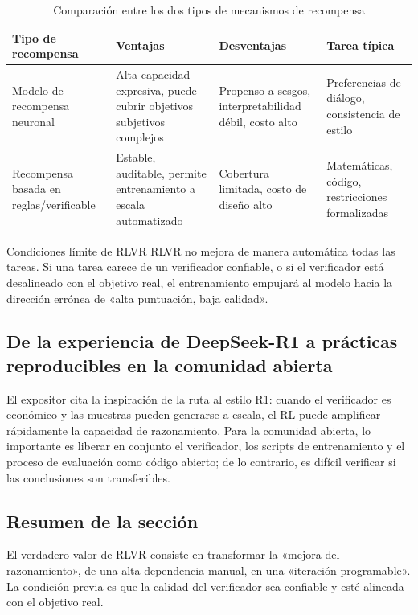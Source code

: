 \documentclass[a4paper]{article}
\begin{document}
\begin{table}[H]
\centering
\renewcommand{\arraystretch}{1.2}
\begin{tabular}{p{2.8cm}p{3.6cm}p{3.8cm}p{2.8cm}}
\toprule
\textbf{Tipo de recompensa} & \textbf{Ventajas} & \textbf{Desventajas} & \textbf{Tarea típica} \\
\midrule
Modelo de recompensa neuronal & Alta capacidad expresiva, puede cubrir objetivos subjetivos complejos & Propenso a sesgos, interpretabilidad débil, costo alto & Preferencias de diálogo, consistencia de estilo \\
Recompensa basada en reglas/verificable & Estable, auditable, permite entrenamiento a escala automatizado & Cobertura limitada, costo de diseño alto & Matemáticas, código, restricciones formalizadas \\
\bottomrule
\end{tabular}
\caption{Comparación entre los dos tipos de mecanismos de recompensa}
\end{table}

\begin{warningbox}{Condiciones límite de RLVR}
RLVR no mejora de manera automática todas las tareas. Si una tarea carece de un verificador confiable, o si el verificador está desalineado con el objetivo real, el entrenamiento empujará al modelo hacia la dirección errónea de «alta puntuación, baja calidad».
\end{warningbox}

\subsection{De la experiencia de DeepSeek-R1 a prácticas reproducibles en la comunidad abierta}
El expositor cita la inspiración de la ruta al estilo R1: cuando el verificador es económico y las muestras pueden generarse a escala, el RL puede amplificar rápidamente la capacidad de razonamiento. Para la comunidad abierta, lo importante es liberar en conjunto el verificador, los scripts de entrenamiento y el proceso de evaluación como código abierto; de lo contrario, es difícil verificar si las conclusiones son transferibles.

\subsection{Resumen de la sección}
El verdadero valor de RLVR consiste en transformar la «mejora del razonamiento», de una alta dependencia manual, en una «iteración programable». La condición previa es que la calidad del verificador sea confiable y esté alineada con el objetivo real.
\end{document}
